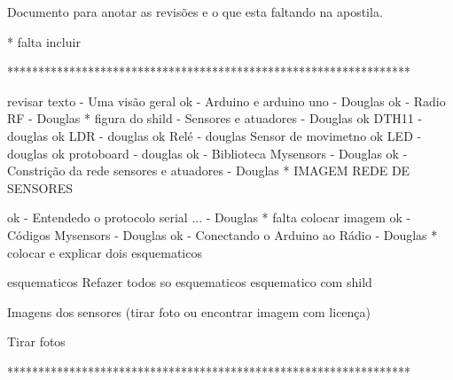 Documento para anotar as revisões e o que esta faltando na apostila. 

* falta incluir

*****************************************************************

revisar texto 
 - Uma visão geral
ok - Arduino e arduino uno - Douglas
ok - Radio RF - Douglas 
    * figura do shild
 - Sensores e atuadores - Douglas 
 ok  DTH11 -  douglas
 ok  LDR - douglas
 ok  Relé - douglas
     Sensor de movimetno
 ok  LED - douglas
 ok  protoboard - douglas
ok - Biblioteca Mysensors -  Douglas
ok - Constrição da rede sensores e atuadores - Douglas
    * IMAGEM REDE DE SENSORES

ok - Entendedo o protocolo serial ... - Douglas
    * falta colocar imagem 
ok - Códigos Mysensors - Douglas
ok - Conectando o Arduino ao Rádio - Douglas
    * colocar e explicar dois esquematicos
 
 

esquematicos 
    Refazer todos so esquematicos
    esquematico com shild 
    
Imagens dos sensores (tirar foto ou encontrar imagem com licença)

Tirar fotos

*****************************************************************

